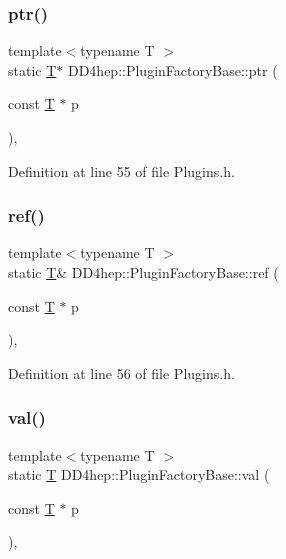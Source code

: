 \subsubsection{\texorpdfstring{ptr()}{ptr()}}
{\footnotesize\ttfamily template$<$typename T $>$ \\
static \hyperlink{class_t}{T}$\ast$ D\+D4hep\+::\+Plugin\+Factory\+Base\+::ptr (\begin{DoxyParamCaption}\item[{const \hyperlink{class_t}{T} $\ast$}]{p }\end{DoxyParamCaption})\hspace{0.3cm}{\ttfamily [inline]}, {\ttfamily [static]}}



Definition at line 55 of file Plugins.\+h.

\hypertarget{struct_d_d4hep_1_1_plugin_factory_base_af5e80d94fc2bd6eaa33e8a7437c78db5}{}\label{struct_d_d4hep_1_1_plugin_factory_base_af5e80d94fc2bd6eaa33e8a7437c78db5} 
\subsubsection{\texorpdfstring{ref()}{ref()}}
{\footnotesize\ttfamily template$<$typename T $>$ \\
static \hyperlink{class_t}{T}\& D\+D4hep\+::\+Plugin\+Factory\+Base\+::ref (\begin{DoxyParamCaption}\item[{const \hyperlink{class_t}{T} $\ast$}]{p }\end{DoxyParamCaption})\hspace{0.3cm}{\ttfamily [inline]}, {\ttfamily [static]}}



Definition at line 56 of file Plugins.\+h.

\hypertarget{struct_d_d4hep_1_1_plugin_factory_base_afd305aea9194b03ea56cd99a61f491d1}{}\label{struct_d_d4hep_1_1_plugin_factory_base_afd305aea9194b03ea56cd99a61f491d1} 
\subsubsection{\texorpdfstring{val()}{val()}}
{\footnotesize\ttfamily template$<$typename T $>$ \\
static \hyperlink{class_t}{T} D\+D4hep\+::\+Plugin\+Factory\+Base\+::val (\begin{DoxyParamCaption}\item[{const \hyperlink{class_t}{T} $\ast$}]{p }\end{DoxyParamCaption})\hspace{0.3cm}{\ttfamily [inline]}, {\ttfamily [static]}}



